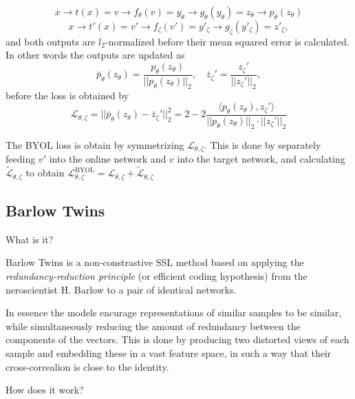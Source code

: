 \documentclass[../../thesis.tex]{subfiles}
\begin{document}
\begin{equation}
    x \to t(x) = v \to f_\theta(v) = y_\theta \to g_\theta (y_\theta) = z_\theta \to p_\theta(z_\theta)
\end{equation}
\begin{equation}
    x \to t'(x) = v' \to f_\zeta(v') = y'_\zeta \to g_\zeta (y'_\zeta) = z'_\zeta,
\end{equation}
and both outputs are $l_2$-normalized before their mean squared error is calculated. In other words the outputs are updated as
\begin{equation}
    \bar{p}_\theta(z_\theta) = \frac{p_\theta(z_\theta)}{||p_\theta(z_\theta)||_2}, \quad \bar{z}_\zeta' = \frac{z_\zeta'}{||z_\zeta'||_2},
\end{equation}
before the loss is obtained by 
\begin{equation}
    \mathcal{L}_{\theta,\zeta} = ||\bar{p}_\theta(z_\theta) - \bar{z}_\zeta'||_2^2 = 2-2 \frac{\langle p_\theta(z_\theta), z_\zeta'\rangle}{||p_\theta(z_\theta)||_2\cdot||z_\zeta'||_2}
\end{equation}

The BYOL loss is obtain by symmetrizing $\mathcal{L}_{\theta,\zeta}$. This is done by separately feeding $v'$ into the online network and $v$ into the target network, and calculating $\mathcal{\tilde{L}}_{\theta,\zeta}$ to obtain $\mathcal{L}^{\text{BYOL}}_{\theta,\zeta} = \mathcal{L}_{\theta,\zeta} + \mathcal{\tilde{L}}_{\theta,\zeta}$







\subsection{Barlow Twins}
What is it?

Barlow Twins is a non-constrastive SSL method based on applying the \textit{redundancy-reduction principle} (or efficient coding hypothesis) \cite{Barlow_origin} from the neroscientist H. Barlow to a pair of identical networks. 

In essence the models encurage representations of similar samples to be similar, while simultaneously reducing the amount of redundancy between the components of the vectors. This is done by producing two distorted views of each sample and embedding these in a vast feature space, in such a way that their cross-correalion is close to the identity. 

How does it work?
\end{document}
